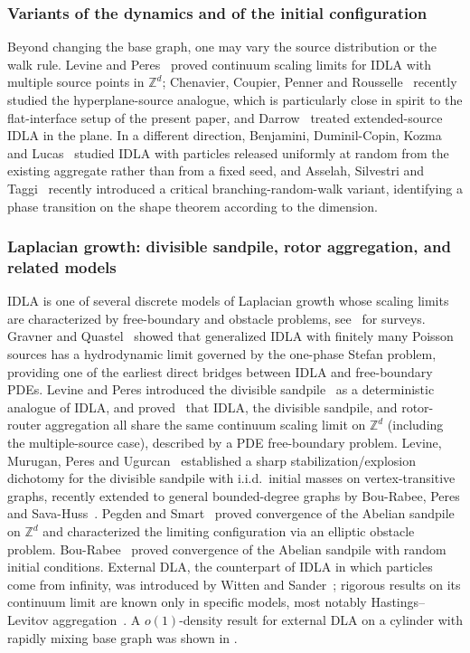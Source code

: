 \documentclass[11pt,a4paper,reqno]{amsart}
\theoremstyle{definition}
\newcommand{\bbZ}{{\ensuremath{\mathbb Z}} }
\begin{document}
\subsubsection{Variants of the dynamics and of the initial configuration}
Beyond changing the base graph, one may vary the source distribution or the walk rule. Levine and Peres~\cite{levine2010scaling} proved continuum scaling limits for IDLA with multiple source points in $\bbZ^d$; Chenavier, Coupier, Penner and Rousselle~\cite{chenavier2024hyperplane} recently studied the hyperplane-source analogue, which is particularly close in spirit to the flat-interface setup of the present paper, and Darrow~\cite{darrow2024extended} treated extended-source IDLA in the plane. In a different direction, Benjamini, Duminil-Copin, Kozma and Lucas~\cite{benjamini2017internal} studied IDLA with particles released uniformly at random from the existing aggregate rather than from a fixed seed, and Asselah, Silvestri and Taggi~\cite{asselah2025internal} recently introduced a critical branching-random-walk variant, identifying a phase transition on the shape theorem according to the dimension.

\subsubsection{Laplacian growth: divisible sandpile, rotor aggregation, and related models}
IDLA is one of several discrete models of Laplacian growth whose scaling limits are characterized by free-boundary and obstacle problems, see~\cite{holroyd2008chip, levine2017laplacian} for surveys. Gravner and Quastel~\cite{gravner2000internal} showed that generalized IDLA with finitely many Poisson sources has a hydrodynamic limit governed by the one-phase Stefan problem, providing one of the earliest direct bridges between IDLA and free-boundary PDEs. Levine and Peres introduced the divisible sandpile~\cite{levine2009strong} as a deterministic analogue of IDLA, and proved~\cite{levine2010scaling} that IDLA, the divisible sandpile, and rotor-router aggregation all share the same continuum scaling limit on $\bbZ^d$ (including the multiple-source case), described by a PDE free-boundary problem. Levine, Murugan, Peres and Ugurcan~\cite{levine2016divisible} established a sharp stabilization/explosion dichotomy for the divisible sandpile with i.i.d.\ initial masses on vertex-transitive graphs, recently extended to general bounded-degree graphs by Bou-Rabee, Peres and Sava-Huss~\cite{bourabee2026divisible}. Pegden and Smart~\cite{pegden2013convergence} proved convergence of the Abelian sandpile on $\bbZ^d$ and characterized the limiting configuration via an elliptic obstacle problem. Bou-Rabee~\cite{bourabee2019convergence, bourabee2021exploding} proved convergence of the Abelian sandpile with random initial conditions. External DLA, the counterpart of IDLA in which particles come from infinity, was introduced by Witten and Sander~\cite{witten1981diffusion}; rigorous results on its continuum limit are known only in specific models, most notably Hastings--Levitov aggregation~\cite{hastings1998laplacian, norris2023scaling, norris2024stability}. A $o(1)$-density result for external DLA on a cylinder with rapidly mixing base graph was shown in \cite{BY08DLA}.
\end{document}
